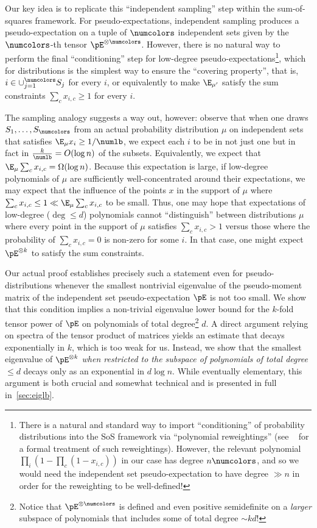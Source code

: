 Our key idea is to replicate this ``independent sampling'' step within the sum-of-squares framework. For pseudo-expectations, independent sampling produces a pseudo-expectation on a tuple of $\numcolors$ independent sets given by the $\numcolors$-th tensor $\pE^{\otimes \numcolors}$. However, there is no natural way to perform the final ``conditioning'' step for low-degree pseudo-expectations\footnote{There is a natural and standard way to import ``conditioning'' of probability distributions into the SoS framework via ``polynomial reweightings'' (see ~\cite{DBLP:conf/stoc/BarakKS17} for a formal treatment of such reweightings). However, the relevant polynomial $\prod_{i} (1 - \prod_{c} (1 - x_{i,c}))$ in our case has degree $n \numcolors$, and so we would need the independent set pseudo-expectation to have degree $\gg n$ in order for the reweighting to be well-defined!}, which for distributions is the simplest way to ensure the ``covering property'', that is,  $i \in \cup_{j = 1}^{\numcolors} S_j$ for every $i$, or equivalently to make $\E_{\mu'}$ satisfy the sum constraints $\sum_c x_{i,c} \geq 1$ for every $i$. 

The sampling analogy suggests a way out, however: observe that when one draws $S_1, \dots, S_{\numcolors}$ from an actual probability distribution $\mu$ on independent sets that satisfies $\E_{\mu} x_i \geq 1/\numlb$, we expect each $i$ to be in not just one but in fact in $\frac{k}{\numlb} = O(\log n)$ of the subsets. Equivalently, we expect that $\E_{\mu} \sum_c x_{i,c} = \Omega(\log n)$. Because this expectation is large, if low-degree polynomials of $\mu$ are sufficiently well-concentrated around their expectations, we may expect that the influence of the points $x$ in the support of $\mu$ where $\sum_{c} x_{i,c} \leq 1 \ll \E_{\mu} \sum_{c} x_{i,c}$ to be small. Thus, one may hope that expectations of low-degree ($\deg \leq d$) polynomials cannot ``distinguish'' between distributions $\mu$ where every point in the support of $\mu$ satisfies $\sum_c x_{i,c} > 1$ versus those where the probability of $\sum_c x_{i,c} = 0$ is non-zero for some $i$. In that case, one might expect $\pE^{\otimes k}$ to satisfy the sum constraints. 

Our actual proof establishes precisely such a statement even for pseudo-distributions whenever the smallest nontrivial eigenvalue of the pseudo-moment matrix of the independent set pseudo-expectation $\pE$ is not too small. We show that this condition implies a non-trivial eigenvalue lower bound for the $k$-fold tensor power of $\pE$ on polynomials of total degree\footnote{Notice that $\pE^{\otimes \numcolors}$ is defined and even positive semidefinite on a \emph{larger} subspace of polynomials that includes some of total degree $\sim kd$!} $d$. A direct argument relying on spectra of the tensor product of matrices yields an estimate that decays exponentially in $k$, which is too weak for us. Instead, we show that the smallest eigenvalue of $\pE^{\otimes k}$ \emph{when restricted to the subspace of polynomials of total degree $\leq d$} decays only as an exponential in $d \log n$. While eventually elementary, this argument is both crucial and somewhat technical and is presented in full in~\cref{sec:eiglb}. 


